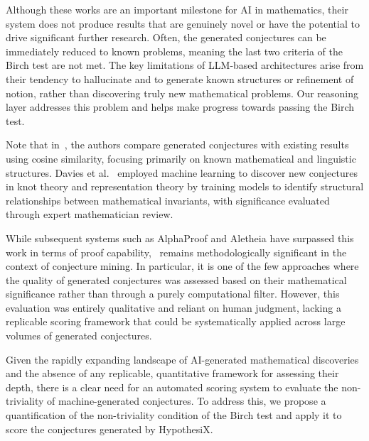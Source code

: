 \documentclass[11pt,reqno]{amsart}
\theoremstyle{plain}\newtheorem{theorem}{Theorem}[section]
\numberwithin{equation}{section}
\begin{document}
\medskip
\noindent
Although these works are an important milestone for AI in mathematics, their system does not produce results that are genuinely novel or have the potential to drive significant further research. Often, the generated conjectures can be immediately reduced to known problems, meaning the last two criteria of the Birch test are not met. The key limitations of LLM-based architectures arise from their tendency to hallucinate and to generate known structures or refinement of notion, rather than discovering truly new mathematical problems. Our reasoning layer addresses this problem and helps make progress towards passing the Birch test.

\medskip
\noindent
Note that in~\cite{chuharski2024mining}, the authors compare generated conjectures with existing results using cosine similarity, focusing primarily on known mathematical and linguistic structures. Davies et al.~\cite{alex} employed machine learning to discover new conjectures in knot theory and representation theory by training models to identify structural relationships between mathematical invariants, with significance evaluated through expert mathematician review. 

\medskip
While subsequent systems such as AlphaProof and Aletheia have surpassed this work in terms of proof capability,~\cite{alex} remains methodologically significant in the context of conjecture mining. In particular, it is one of the few approaches where the quality of generated conjectures was assessed based on their mathematical significance rather than through a purely computational filter. However, this evaluation was entirely qualitative and reliant on human judgment, lacking a replicable scoring framework that could be systematically applied across large volumes of generated conjectures.

Given the rapidly expanding landscape of AI-generated mathematical discoveries and the absence of any replicable, quantitative framework for assessing their depth, there is a clear need for an automated scoring system to evaluate the non-triviality of machine-generated conjectures. To address this, we propose a quantification of the non-triviality condition of the Birch test and apply it to score the conjectures generated by HypothesiX.


\end{document}
